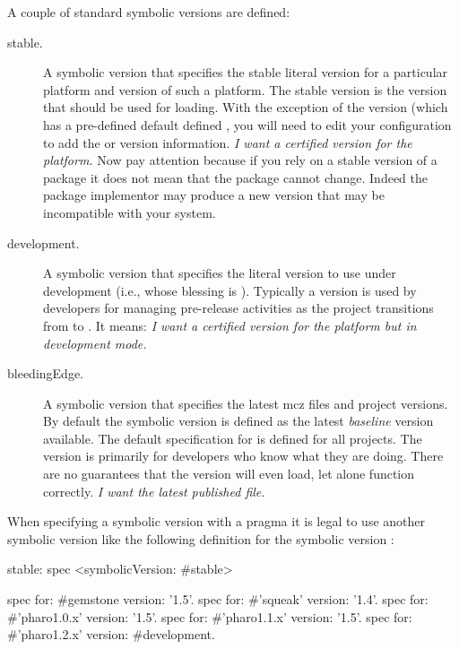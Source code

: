 \documentclass[a4paper,10pt,twoside]{book}
\begin{document}
A couple of standard symbolic versions are defined:

\begin{description}
\item[stable.] A symbolic version that specifies the stable literal version for a particular platform and version of such a platform. The stable version is the version that should be used for loading. With the exception of the  version (which has a pre-defined default defined%
, you will need to edit your configuration to add the  or  version information. \emph{I want a certified version for the platform.} Now pay attention because if you rely on a stable version of a package it does not mean that the package cannot change. Indeed the package implementor may produce a new version that may be incompatible with your system. 

\item[development.] A symbolic version that specifies the literal version to use under development (i.e., whose blessing is ). Typically a  version is used by developers for managing pre-release activities as the project transitions from  to . %
It means: \emph{I want a certified version for the platform but in development mode.}



\item[bleedingEdge.]  A symbolic version that specifies the latest mcz files and project versions. By default the  symbolic version is defined as the latest \emph{baseline} version available. The default specification for  is defined for all projects. The  version is primarily for developers who know what they are doing. There are no guarantees that the  version will even load, let alone function correctly. \emph{I want the latest published file.}

\end{description}


When specifying a symbolic version with a  pragma it is legal to use another symbolic version like the following definition for the symbolic version :

\begin{code}{}
stable: spec
       <symbolicVersion: #stable>

       spec for: #gemstone version: '1.5'.
       spec for: #'squeak' version: '1.4'.
       spec for: #'pharo1.0.x' version: '1.5'.
       spec for: #'pharo1.1.x' version: '1.5'.
       spec for: #'pharo1.2.x' version: #development.
\end{code}
\end{document}
